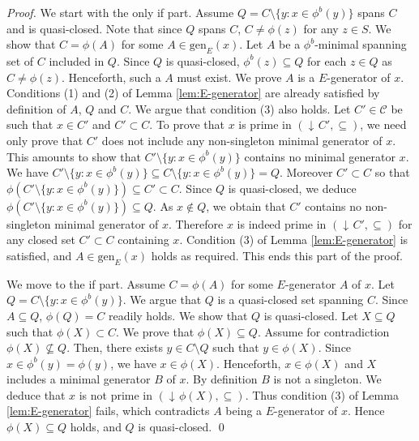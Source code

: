 \documentclass[12pt, a4paper]{article}
\def\arxiv{1}
\newcommand{\cc}[1]{\mathcal{#1}}  %
\newcommand{\st}{:}  %
\newcommand{\U}{S}  %
\DeclareMathOperator{\idl}{\downarrow\!}  %
\newcommand{\cl}{\phi}  %
\newcommand{\cs}{\cc{C}} %
\newcommand{\gen}{\mathrm{gen}}  %
\begin{document}
\begin{proof}
We start with the only if part.
Assume $Q = C \setminus \{y \st x \in \cl^b(y)\}$ spans $C$ and is quasi-closed.
Note that since $Q$ spans $C$, $C \neq \cl(z)$ for any $z \in \U$.
We show that $C = \cl(A)$ for some $A \in \gen_E(x)$. 
Let $A$ be a $\cl^b$-minimal spanning set of $C$ included in $Q$.
Since $Q$ is quasi-closed, $\cl^b(z) \subseteq Q$ for each $z \in Q$ as $C \neq \cl(z)$.
Henceforth, such a $A$ must exist.
We prove $A$ is a $E$-generator of $x$.
Conditions (1) and (2) of Lemma \ref{lem:E-generator} are already satisfied by definition of $A$, $Q$ and $C$.
We argue that condition (3) also holds.
Let $C' \in \cs$ be such that $x \in C'$ and $C' \subset C$.
To prove that $x$ is prime in $(\idl C', \subseteq)$, we need only prove that $C'$ does not include any  non-singleton minimal generator of $x$.
This amounts to show that $C' \setminus \{y \st x \in \cl^b(y)\}$ contains no minimal generator $x$.
We have $C' \setminus \{y \st x \in \cl^b(y)\} \subseteq C \setminus \{y \st x \in \cl^b(y)\} = Q$.
Moreover $C' \subset C$ so that $\cl(C' \setminus \{y \st x \in \cl^b(y)\}) \subseteq C' \subset C$.
Since $Q$ is quasi-closed, we deduce $\cl(C' \setminus \{y \st x \in \cl^b(y)\}) \subseteq Q$.
As $x \notin Q$, we obtain that $C'$ contains no non-singleton minimal generator of $x$.
Therefore $x$ is indeed prime in $(\idl C', \subseteq)$ for any closed set $C' \subset C$ containing $x$.
Condition (3) of Lemma \ref{lem:E-generator} is satisfied, and $A \in \gen_E(x)$ holds as required. 
This ends this part of the proof.


We move to the if part.
Assume $C = \cl(A)$ for some $E$-generator $A$ of $x$.
Let $Q = C \setminus \{y \st x \in \cl^b(y)\}$.
We argue that $Q$ is a quasi-closed set spanning $C$.
Since $A \subseteq Q$, $\cl(Q) = C$ readily holds.
We show that $Q$ is quasi-closed.
Let $X \subseteq Q$ such that $\cl(X) \subset C$. 
We prove that $\cl(X) \subseteq Q$.
Assume for contradiction $\cl(X) \nsubseteq Q$.
Then, there exists $y \in C \setminus Q$ such that $y \in \cl(X)$.
Since $x \in \cl^b(y) = \cl(y)$, we have $x \in \cl(X)$.
Henceforth, $x \in \cl(X)$ and $X$ includes a minimal generator $B$ of $x$.
By definition $B$ is not a singleton.
We deduce that $x$ is not prime in $(\idl \cl(X), \subseteq)$.
Thus condition (3) of Lemma \ref{lem:E-generator} fails, which contradicts $A$ being a $E$-generator of $x$.
Hence $\cl(X) \subseteq Q$ holds, and $Q$ is quasi-closed.
\ifx\arxiv\undefined
\qed
\fi
\end{proof}
\end{document}

